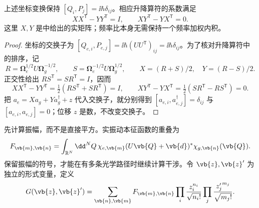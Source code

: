 \begin{proposition}[模式旋转的正则条件]
上述坐标变换保持 $[Q_i,P_j]=\ii\hbar\delta_{ij}$。相应升降算符的系数满足
\begin{equation}
 XX^{\mathsf T}-YY^{\mathsf T}=I,\qquad
 XY^{\mathsf T}-YX^{\mathsf T}=0.
 \label{eq:duschinsky-symplectic}
\end{equation}
这里 $X,Y$ 是中给出的实矩阵；频率比本身无需保持一个频率加权内积。
\end{proposition}
\begin{proof}
坐标的交换子为 $[Q_{e,i},P_{e,j}]=\ii\hbar(UU^{\mathsf T})_{ij}=\ii\hbar\delta_{ij}$。为了核对升降算符中的排序，记
\[
 R=\boldsymbol\Omega_e^{1/2}U\boldsymbol\Omega_g^{-1/2},
 \qquad S=\boldsymbol\Omega_e^{-1/2}U\boldsymbol\Omega_g^{1/2},
 \qquad X=(R+S)/2,\quad Y=(R-S)/2.
\]
正交性给出 $RS^{\mathsf T}=SR^{\mathsf T}=I$，因而
\[
 XX^{\mathsf T}-YY^{\mathsf T}
 =\tfrac12(RS^{\mathsf T}+SR^{\mathsf T})=I,
 \qquad
 XY^{\mathsf T}-YX^{\mathsf T}
 =\tfrac12(SR^{\mathsf T}-RS^{\mathsf T})=0.
\]
把 $a_e=Xa_g+Ya_g^\dagger+z$ 代入交换子，就分别得到 $[a_{e,i},a_{e,j}^\dagger]=\delta_{ij}$ 与 $[a_{e,i},a_{e,j}]=0$；位移 $z$ 是数，不改变交换子。
\end{proof}

先计算振幅，而不是直接平方。实振动本征函数的重叠为
\begin{equation}
 F_{\vb{m},\vb{n}}
 =\int_{\mathbb R^N}\dd^NQ\,
 \chi_{e,\vb{m}}(U\vb{Q}+\vb{d})^*
 \chi_{g,\vb{n}}(\vb{Q}).
 \label{eq:multimode-fc-integral}
\end{equation}
保留振幅的符号，才能在有多条光学路径时继续计算干涉。令 $\vb{z},\vb{z}'$ 为独立的形式变量，定义
\begin{equation}
 G(\vb{z},\vb{z}')
 =\sum_{\vb{n},\vb{m}}F_{\vb{m},\vb{n}}
   \prod_i\frac{z_i^{n_i}}{\sqrt{n_i!}}
   \prod_j\frac{{z'_j}^{m_j}}{\sqrt{m_j!}}.
 \label{eq:multimode-fc-amplitude-generator}
\end{equation}

